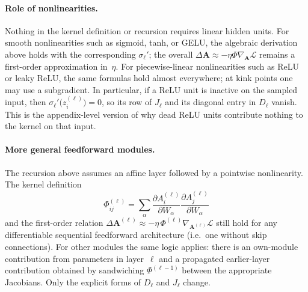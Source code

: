 \documentclass[10pt]{article}
\newcommand{\vA}{\mathbf{A}}
\newcommand{\loss}{\mathcal{L}}
\begin{document}
\paragraph{Role of nonlinearities.}
Nothing in the kernel definition or recursion requires linear hidden units.  For smooth nonlinearities such as sigmoid, tanh, or GELU, the algebraic derivation above holds with the corresponding $\sigma_\ell'$; the overall $\Delta\vA\approx-\eta\Phi\nabla_{\!\vA}\loss$ remains a first-order approximation in~$\eta$.  For piecewise-linear nonlinearities such as ReLU or leaky ReLU, the same formulas hold almost everywhere; at kink points one may use a subgradient.  In particular, if a ReLU unit is inactive on the sampled input, then $\sigma_\ell'\!\bigl(z_i^{(\ell)}\bigr)=0$, so its row of $J_\ell$ and its diagonal entry in $D_\ell$ vanish.  This is the appendix-level version of why dead ReLU units contribute nothing to the kernel on that input.

\paragraph{More general feedforward modules.}
The recursion above assumes an affine layer followed by a pointwise nonlinearity.  The kernel definition
\[
  \Phi_{ij}^{(\ell)} = \sum_\alpha
  \frac{\partial A_i^{(\ell)}}{\partial W_\alpha}
  \frac{\partial A_j^{(\ell)}}{\partial W_\alpha}
\]
and the first-order relation $\Delta\vA^{(\ell)}\approx-\eta\,\Phi^{(\ell)}\nabla_{\!\vA^{(\ell)}}\loss$ still hold for any differentiable sequential feedforward architecture (i.e.\ one without skip connections).  For other modules the same logic applies: there is an own-module contribution from parameters in layer~$\ell$ and a propagated earlier-layer contribution obtained by sandwiching $\Phi^{(\ell-1)}$ between the appropriate Jacobians.  Only the explicit forms of $D_\ell$ and $J_\ell$ change.
\end{document}
